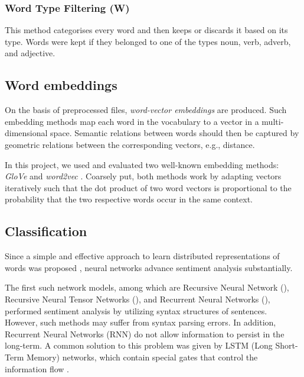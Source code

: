 \subsubsection{Word Type Filtering (W)}\label{sec:method:word-type-filtering}

This method categorises every word and then keeps or discards it based on its type. Words were kept if they belonged to one of the types noun, verb, adverb, and adjective.

\subsection{Word embeddings}\label{sec:method:embeddings}

On the basis of preprocessed files, \textit{word-vector embeddings} are produced. Such embedding methods map each word in the vocabulary to a vector in a multi-dimensional space. Semantic relations between words should then be captured by geometric relations between the corresponding vectors, e.g., distance.

In this project, we used and evaluated two well-known embedding methods: \textit{GloVe} \cite{pennington2014glove} and \textit{word2vec} \cite{mikolov2013word2vec}. Coarsely put, both methods work by adapting vectors iteratively such that the dot product of two word vectors is proportional to the probability that the two respective words occur in the same context.

\subsection{Classification}\label{sec:method:classification}

Since a simple and effective approach to learn distributed representations of words was proposed \cite{mikolov2013word2vec}, neural networks advance sentiment analysis substantially.
	
The first such network models, among which are Recursive Neural Network (\cite{socher2011parsing, dong2014adaptive, qian2015learning}), Recursive Neural Tensor Networks (\cite{socher2013reasoning}), and Recurrent Neural Networks (\cite{mikolov2010recurrent}), performed sentiment analysis by utilizing syntax structures of sentences. However, such methods may suffer from syntax parsing errors. In addition, Recurrent Neural Networks (RNN) do not allow information to persist in the long-term. A common solution to this problem was given by LSTM (Long Short-Term Memory) networks, which contain special gates that control the information flow \cite{hochreiter1997long}. 
	

